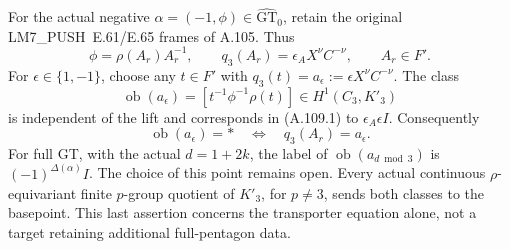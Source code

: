 For the actual negative \(\alpha=(-1,\phi)\in\widehat{\mathrm{GT}}_0\),
retain the original LM7\_PUSH~E.61/E.65 frames of A.105. Thus
\[
 \phi=\rho(A_r)A_r^{-1},\qquad
 q_3(A_r)=\epsilon_A X^\nu C^{-\nu},\qquad A_r\in F'.
\]
For \(\epsilon\in\{1,-1\}\), choose any \(t\in F'\) with
\(q_3(t)=a_\epsilon:=\epsilon X^\nu C^{-\nu}\). The class
\[
 \operatorname{ob}(a_\epsilon)
   =[t^{-1}\phi^{-1}\rho(t)]\in H^1(C_3,K'_3)
 \tag{A.109.3}
\]
is independent of the lift and corresponds in (A.109.1) to
\(\epsilon_A\epsilon I\). Consequently
\[
 \operatorname{ob}(a_\epsilon)=*
       \quad\Longleftrightarrow\quad q_3(A_r)=a_\epsilon.
 \tag{A.109.4}
\]
For full GT, with the actual \(d=1+2k\), the label of
\(\operatorname{ob}(a_{d\bmod3})\) is
\((-1)^{\Delta(\alpha)}I\). The choice of this point remains open.
Every actual continuous \(\rho\)-equivariant finite \(p\)-group
quotient of \(K'_3\), for \(p\ne3\), sends both classes to the
basepoint. This last assertion concerns the transporter equation
alone, not a target retaining additional full-pentagon data.

